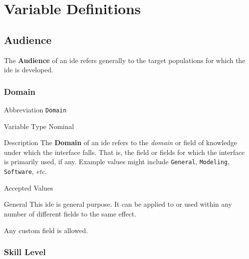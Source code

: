 \section{Variable Definitions}

\subsection{Audience}
\label{sec:audience}

The \textbf{Audience} of an \ac{ide} refers generally to the target
populations for which the \ac{ide} is developed.

\subsubsection{Domain}
\label{subsec:domain}

\begin{AlignedDesc}
  \item[Abbreviation] \texttt{Domain}

  \item[Variable Type] Nominal

  \item[Description] The \textbf{Domain} of an \ac{ide} refers to the
  \textit{domain} or field of knowledge under which the interface falls.
  That is, the field or fields for which the interface is primarily used,
  if any. Example values might include \texttt{General}, \texttt{Modeling},
  \texttt{Software}, \textit{etc}.

  \item[Accepted Values]

  \begin{AlignedDesc}
    \item[General] This \ac{ide} is general purpose. It can be applied to
    or used within any number of different fields to the same effect.
    \item[\textellipsis] Any custom field is allowed.
  \end{AlignedDesc}

\end{AlignedDesc}

\subsubsection{Skill Level}
\label{subsec:skill}


